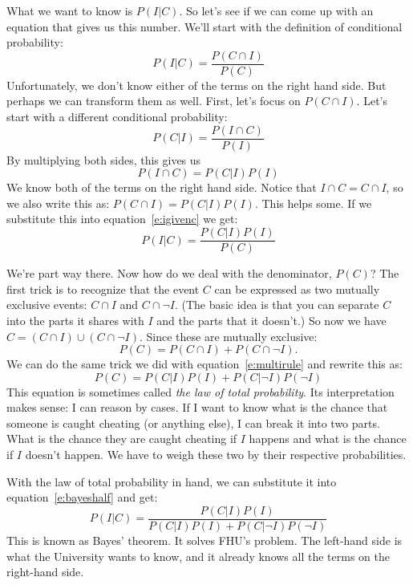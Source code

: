 What we want to know is $P(I|C)$.  So let's see if we can come up with an equation that gives us this number.  We'll start with the definition of conditional probability:
\begin{equation}
\label{e:igivenc}
P(I|C) = \frac{P(C \cap I)}{P(C)}
\end{equation}
Unfortunately, we don't know either of the terms on the right hand side.  But perhaps we can transform them as well.  First, let's focus on $P(C \cap I)$. Let's start with a different conditional probability:
\begin{equation*}
P(C|I) = \frac{P(I \cap C)}{P(I)}
\end{equation*}
By multiplying both sides, this gives us
\begin{equation}
\label{e:multirule}
P(I \cap C) = P(C|I)P(I)
\end{equation}
We know both of the terms on the right hand side. Notice that $I \cap C = C \cap I$, so we also write this as: $P(C \cap I) = P(C|I)P(I)$.  This helps some. If we substitute this into equation~\ref{e:igivenc} we get:
\begin{equation}
\label{e:bayeshalf}
P(I|C) = \frac{P(C|I)P(I)}{P(C)}
\end{equation}

We're part way there. Now how do we deal with the denominator, $P(C)$? The first trick is to recognize that the event $C$ can be expressed as two mutually exclusive events: $C \cap I$ and $C \cap \neg I$.  (The basic idea is that you can separate $C$ into the parts it shares with $I$ and the parts that it doesn't.)  So now we have $C = (C \cap I) \cup (C \cap \neg I)$. Since these are mutually exclusive:
\begin{equation*}
P(C) = P(C \cap I) + P(C \cap \neg I).
\end{equation*}
We can do the same trick we did with equation~\ref{e:multirule} and rewrite this as:
\begin{equation}
\label{e:lawoftotalprob}
P(C) = P(C|I)P(I) + P(C|\neg I)P(\neg I)
\end{equation}
This equation is sometimes called {\it the law of total probability}. Its interpretation makes sense: I can reason by cases. If I want to know what is the chance that someone is caught cheating (or anything else), I can break it into two parts. What is the chance they are caught cheating if $I$ happens and what is the chance if $I$ doesn't happen. We have to weigh these two by their respective probabilities.

With the law of total probability in hand, we can substitute it into equation~\ref{e:bayeshalf} and get:
\begin{equation}
\label{e:bayesthm}
P(I|C) = \frac{P(C|I)P(I)}{P(C|I)P(I) + P(C|\neg I)P(\neg I)}
\end{equation}
This is known as Bayes' theorem. It solves FHU's problem.  The left-hand side is what the University wants to know, and it already knows all the terms on the right-hand side. 

